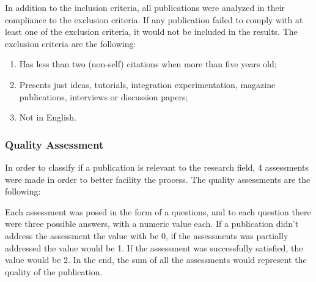 In addition to the inclusion criteria, all publications were analyzed in their compliance to the exclusion criteria. If any publication failed to comply with at least one of the exclusion criteria, it would not be included in the results. The exclusion criteria are the following:

\begin{enumerate}
    \item Has less than two (non-self) citations when more than five years old;
    \item Presents just ideas, tutorials, integration experimentation, magazine publications, interviews or discussion papers;
    \item Not in English.
\end{enumerate}{}

\subsubsection{Quality Assessment}\label{sec:quality_accessment}

In order to classify if a publication is relevant to the research field, 4 assessments were made in order to better facility the process. The quality assessments are the following:\\

\captionsetup{belowskip=12pt,aboveskip=4pt}
\begin{table}[ht]
    \centering
    \caption{Parameters for measuring the quality of a publication}
    \label{tab:quality_assessment}
\end{table}{}

Each assessment was posed in the form of a questions, and to each question there were three possible answers, with a numeric value each. If a publication didn't address the assessment the value with be 0, if the assessments was partially addressed the value would be 1. If the assessment was successfully satisfied, the value would be 2. In the end, the sum of all the assessments would represent the quality of the publication.

